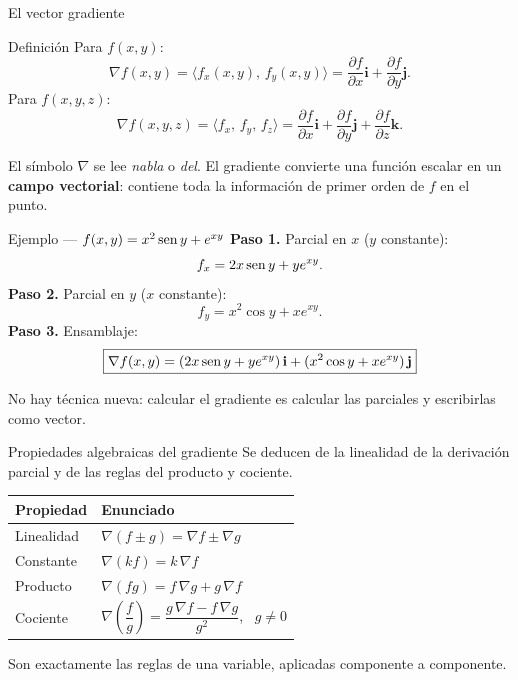 \documentclass[11pt,aspectratio=169]{beamer}
\begin{document}
\begin{frame}{El vector gradiente}
  \begin{block}{Definición}
    Para $f(x,y)$:
    \[
      \nabla f(x,y)=\langle f_x(x,y),\,f_y(x,y)\rangle
                   =\frac{\partial f}{\partial x}\mathbf i+\frac{\partial f}{\partial y}\mathbf j.
    \]
    Para $f(x,y,z)$:
    \[
      \nabla f(x,y,z)=\langle f_x,\,f_y,\,f_z\rangle
                     =\frac{\partial f}{\partial x}\mathbf i+\frac{\partial f}{\partial y}\mathbf j+\frac{\partial f}{\partial z}\mathbf k.
    \]
  \end{block}
  \pause
  \vspace{4pt}
  \begin{center}
  \small\color{gray60} El símbolo $\nabla$ se lee \emph{nabla} o \emph{del}. El gradiente convierte una función escalar en un \textbf{campo vectorial}: contiene toda la información de primer orden de $f$ en el punto.
  \end{center}
\end{frame}

\begin{frame}{Ejemplo --- $f(x,y)=x^2\operatorname{sen} y+e^{xy}$}
  \textbf{Paso 1.} Parcial en $x$ ($y$ constante):
  \[
    f_x=2x\operatorname{sen} y+ye^{xy}.
  \]
  \pause
  \textbf{Paso 2.} Parcial en $y$ ($x$ constante):
  \[
    f_y=x^2\cos y+xe^{xy}.
  \]
  \pause
  \textbf{Paso 3.} Ensamblaje:
  \[
    \boxed{\nabla f(x,y)=(2x\operatorname{sen} y+ye^{xy})\,\mathbf i+(x^2\cos y+xe^{xy})\,\mathbf j}
  \]
  \pause
  \vspace{4pt}
  \begin{center}\small\color{gray60} No hay técnica nueva: calcular el gradiente es calcular las parciales y escribirlas como vector.\end{center}
\end{frame}

\begin{frame}{Propiedades algebraicas del gradiente}
  Se deducen de la linealidad de la derivación parcial y de las reglas del producto y cociente.
  \vspace{8pt}
  \pause
  \begin{center}
  \begin{tabular}{ll}
    \toprule
    \textbf{Propiedad} & \textbf{Enunciado} \\
    \midrule
    Linealidad & $\nabla(f\pm g)=\nabla f\pm\nabla g$ \\[3pt]
    Constante & $\nabla(kf)=k\,\nabla f$ \\[3pt]
    Producto & $\nabla(fg)=f\,\nabla g+g\,\nabla f$ \\[3pt]
    Cociente & $\nabla\!\left(\dfrac{f}{g}\right)=\dfrac{g\,\nabla f-f\,\nabla g}{g^2}$, \ $g\neq 0$ \\
    \bottomrule
  \end{tabular}
  \end{center}
  \vspace{10pt}
  \pause
  \begin{center}\small\color{gray60} Son exactamente las reglas de una variable, aplicadas componente a componente.\end{center}
\end{frame}
\end{document}
